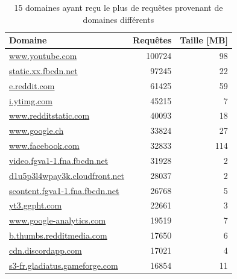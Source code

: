 		\begin{table}[]
\centering
\begin{tabular}{lrr}
\textbf{Domaine}                     & \textbf{Requêtes} & \textbf{Taille {[}MB{]}} \\ \hline
\scriptsize \url{www.youtube.com}                      & 100724            & 98                       \\
\scriptsize \url{static.xx.fbcdn.net}                  & 97245             & 22                       \\
\scriptsize \url{e.reddit.com}                         & 61425             & 59                       \\
\scriptsize \url{i.ytimg.com}                          & 45215             & 7                        \\
\scriptsize \url{www.redditstatic.com}                 & 40093             & 18                       \\
\scriptsize \url{www.google.ch}                        & 33824             & 27                       \\
\scriptsize \url{www.facebook.com}                     & 32833             & 114                      \\
\scriptsize \url{video.fgva1-1.fna.fbcdn.net}          & 31928             & 2                        \\
\scriptsize \url{d1u5p3l4wpay3k.cloudfront.net}        & 28037             & 2                        \\
\scriptsize \url{scontent.fgva1-1.fna.fbcdn.net}       & 26768             & 5                        \\
\scriptsize \url{yt3.ggpht.com}                        & 22661             & 3                        \\
\scriptsize \url{www.google-analytics.com}             & 19519             & 7                        \\
\scriptsize \url{b.thumbs.redditmedia.com}             & 17650             & 6                        \\
\scriptsize \url{cdn.discordapp.com}                   & 17021             & 4                        \\
\scriptsize \url{s3-fr.gladiatus.gameforge.com}        & 16854             & 11                       \\                  
\end{tabular}
\caption{15 domaines ayant reçu le plus de requêtes provenant de domaines différents}
\label{trackers-3}
\end{table}


